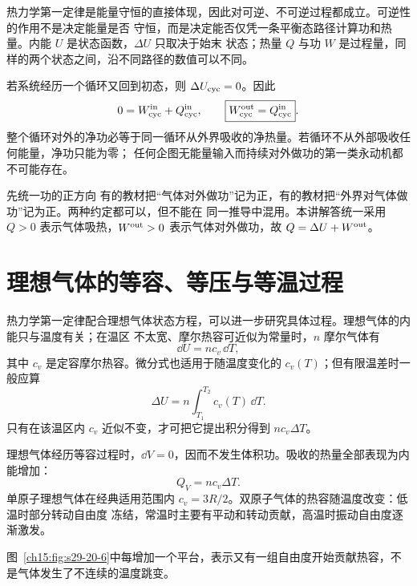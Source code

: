 {热力学第一定律是能量守恒的直接体现，因此对可逆、不可逆过程都成立。可逆性的作用不是决定能量是否
守恒，而是决定能否仅凭一条平衡态路径计算功和热量。内能 $U$ 是状态函数，$\Delta U$ 只取决于始末
状态；热量 $Q$ 与功 $W$ 是过程量，同样的两个状态之间，沿不同路径的数值可以不同。

若系统经历一个循环又回到初态，则 $\Delta U_{\rm cyc}=0$。因此
\begin{equation*}
  0=W^{\rm in}_{\rm cyc}+Q^{\rm in}_{\rm cyc},
  \qquad
  \boxed{W^{\rm out}_{\rm cyc}=Q^{\rm in}_{\rm cyc}}.
\end{equation*}
整个循环对外的净功必等于同一循环从外界吸收的净热量。若循环不从外部吸收任何能量，净功只能为零；
任何企图无能量输入而持续对外做功的第一类永动机都不可能存在。

\begin{warningbox}{先统一功的正方向}
有的教材把“气体对外做功”记为正，有的教材把“外界对气体做功”记为正。两种约定都可以，但不能在
同一推导中混用。本讲解答统一采用 $Q>0$ 表示气体吸热，$W^{\rm out}>0$ 表示气体对外做功，故
$Q=\Delta U+W^{\rm out}$。
\end{warningbox}

\section{理想气体的等容、等压与等温过程}

热力学第一定律配合理想气体状态方程，可以进一步研究具体过程。理想气体的内能只与温度有关；在温区
不太宽、摩尔热容可近似为常量时，$n$ 摩尔气体有
\begin{equation*}
  \dd U=n c_v\,\dd T,
\end{equation*}
其中 $c_v$ 是定容摩尔热容。微分式也适用于随温度变化的 $c_v(T)$；但有限温差时一般应算
\[
 \Delta U=n\int_{T_1}^{T_2}c_v(T)\,\dd T.
\]
只有在该温区内 $c_v$ 近似不变，才可把它提出积分得到 $n c_v\Delta T$。

理想气体经历等容过程时，$\dd V=0$，因而不发生体积功。吸收的热量全部表现为内能增加：
\begin{equation*}
  \boxed{Q_V=n c_v\Delta T}.
\end{equation*}
单原子理想气体在经典适用范围内 $c_v=3R/2$。双原子气体的热容随温度改变：低温时部分转动自由度
冻结，常温时主要有平动和转动贡献，高温时振动自由度逐渐激发。

\par\noindent\begin{minipage}{\linewidth}
\heatCapacityRedraw
{}\label{ch15:fig:s29-20-6}
\end{minipage}\par\medskip
图~\ref{ch15:fig:s29-20-6}中每增加一个平台，表示又有一组自由度开始贡献热容，不是气体发生了不连续的温度跳变。

}
